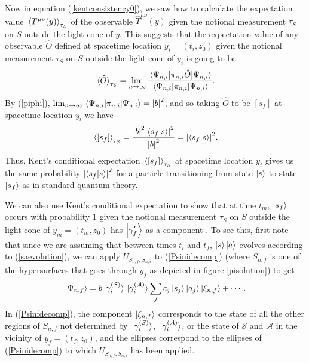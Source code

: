 Now in equation (\ref{kentconsistency0}), we saw how to calculate the expectation value $\ev*{T^{\mu\nu}(y)}_{\tau_S}$ of the observable $\hat{T}^{\mu\nu}(y)$ given the notional measurement $\tau_S$ on $S$ outside the light cone of $y$. This suggests that the expectation value of any observable $\hat{O}$ defined at spacetime location $y_i=(t_i,z_0)$ given the notional measurement $\tau_S$ on $S$ outside the light cone of $y_i$ is going to be
\begin{equation}\label{kentevo}
\ev*{\hat{O}}_{\tau_S}=\lim_{n\rightarrow\infty}\frac{\ev*{\pi_{n,i}\hat{O}}{\Psi_{n,i}}}{\ev*{\pi_{n,i}}{\Psi_{n,i}}}.
\end{equation}
By (\ref{piphi}), $\lim_{n\rightarrow\infty}\ev*{\pi_{n,i}}{\Psi_{n,i}}=\abs{b}^2$, and so taking $\hat{O}$ to be $[s_f]$ at spacetime location $y_i$ we have 
$$ \ev*{[s_f]}_{\tau_S}=\frac{\abs{b}^2\abs{\ip{s_f}{s}}^2}{\abs{b}^2}=\abs{\ip{s_f}{s}}^2.$$
Thus, Kent's conditional expectation $\ev*{[s_f]}_{\tau_S}$ at spacetime location $y_i$ gives us the same probability $\abs{\ip{s_f}{s}}^2$ for a particle transitioning from state $\ket{s}$ to state $\ket{s_f}$ as in standard quantum theory.

We can also use Kent's conditional expectation to show that at time $t_m$, $\ket{s_f}$ occurs with probability $1$ given the notional measurement $\tau_S$ on $S$ outside the light cone of $y_m=(t_m,z_0)$ has $\ket{\gamma_f'}$ as a component . To see this, first note that since we are assuming that between times $t_i$ and $t_f$, $\ket{s}\ket{a}$ evolves according to (\ref{saevolution}), we can apply $U_{S_{n,f},S_{n,i}}$ to (\ref{Psinidecomp}) (where $S_{n,f}$ is one of the hypersurfaces that goes through $y_f$ as depicted in figure \ref{pisolution}) to get
\begin{equation}\label{Psinfdecomp}
	\ket{\Psi_{n,f}}=b\ket*{\gamma_i^{(\mathcal{S})}}\ket*{\gamma_i^{(\mathcal{A})}}\sum_j c_j \ket{s_j}\ket{a_j}\ket{\xi_{n,f}}+\cdots.
	\end{equation} 
In (\ref{Psinfdecomp}), the component $\ket{\xi_{n,f}}$ corresponds to the state of all the other regions of $S_{n,f}$ not determined by $\ket*{\gamma_i^{(\mathcal{S})}}$, $\ket*{\gamma_i^{(\mathcal{A})}}$, or the state of $\mathcal{S}$ and $\mathcal{A}$ in the vicinity of $y_f=(t_f, z_0)$, and the ellipses correspond to the ellipses of (\ref{Psinidecomp}) to which $U_{S_{n,f},S_{n,i}}$ has been applied. 

